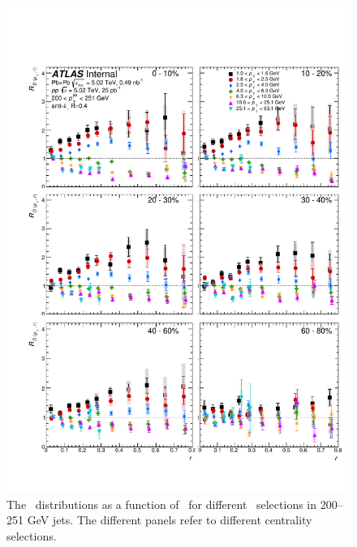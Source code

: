 \begin{figure}[h]
\includegraphics[width=1.0\textwidth]{figures/results/RDpT_dR_jet9.pdf}
\caption{The \RDptr\ distributions as a function of \rvar\ for different \pt\ selections in 200--251 GeV jets. The different panels refer to different centrality selections.}
\label{fig:fullset_rptr_j9}
\end{figure}


